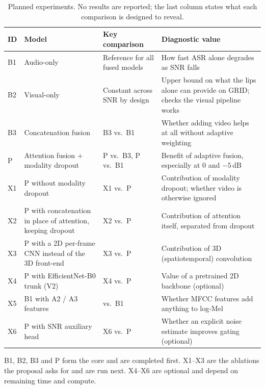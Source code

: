 \begin{table}[H]
\centering
\caption{Planned experiments. No results are reported; the last column states what
each comparison is designed to reveal.}
\label{tab:experiments}
\small
\begin{tabularx}{\textwidth}{@{}p{0.6cm}p{3.2cm}p{3.6cm}X@{}}
\toprule
\textbf{ID} & \textbf{Model} & \textbf{Key comparison} & \textbf{Diagnostic value} \\
\midrule
B1 & Audio-only & Reference for all fused models & How fast ASR alone degrades as SNR falls \\
B2 & Visual-only & Constant across SNR by design & Upper bound on what the lips alone can provide on GRID; checks the visual pipeline works \\
B3 & Concatenation fusion & B3 vs.\ B1 & Whether adding video helps at all without adaptive weighting \\
P  & Attention fusion + modality dropout & P vs.\ B3, P vs.\ B1 & Benefit of adaptive fusion, especially at 0 and $-5$\,dB \\
X1 & P without modality dropout & X1 vs.\ P & Contribution of modality dropout; whether video is otherwise ignored \\
X2 & P with concatenation in place of attention, keeping dropout & X2 vs.\ P & Contribution of attention itself, separated from dropout \\
X3 & P with a 2D per-frame CNN instead of the 3D front-end & X3 vs.\ P & Contribution of 3D (spatiotemporal) convolution \\
X4 & P with EfficientNet-B0 trunk (V2) & X4 vs.\ P & Value of a pretrained 2D backbone (optional) \\
X5 & B1 with A2 / A3 features & vs.\ B1 & Whether MFCC features add anything to log-Mel \\
X6 & P with SNR auxiliary head & X6 vs.\ P & Whether an explicit noise estimate improves gating (optional) \\
\bottomrule
\end{tabularx}
\end{table}

B1, B2, B3 and P form the core and are completed first. X1--X3 are the ablations
the proposal asks for and are run next. X4--X6 are optional and depend on
remaining time and compute.
